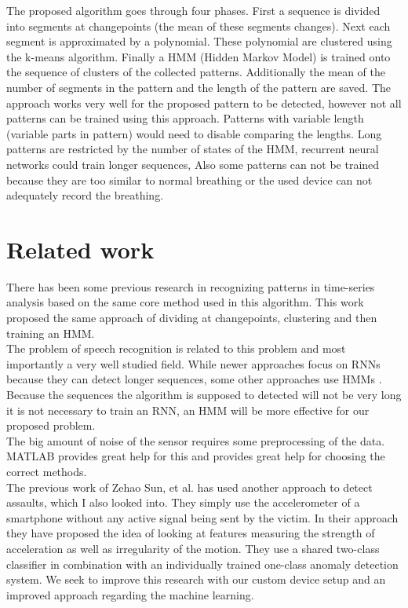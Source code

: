 \documentclass{article}
\begin{document}
The proposed algorithm goes through four phases. First a sequence is divided into segments at changepoints (the mean of these segments changes). Next each segment is approximated by a polynomial. These polynomial are clustered using the k-means algorithm. Finally a HMM (Hidden Markov Model) is trained onto the sequence of clusters of the collected patterns. Additionally the mean of the number of segments in the pattern and the length of the pattern are saved. The approach works very well for the proposed pattern to be detected, however not all patterns can be trained using this approach. Patterns with variable length (variable parts in pattern) would need to disable comparing the lengths. Long patterns are restricted by the number of states of the HMM, recurrent neural networks could train longer sequences, Also some patterns can not be trained because they are too similar to normal breathing or the used device can not adequately record the breathing.
\section{Related work}
\label{sec: related}
There has been some previous research in recognizing patterns in time-series analysis based on the same core method used in this algorithm. \cite{TimeseriesSri, BenChoi, FindingP10} This work proposed the same approach of dividing at changepoints, clustering and then training an HMM.\\
The problem of speech recognition is related to this problem and most importantly a very well studied field. While newer approaches focus on RNNs \cite{machine-learning-paradigms-for-speech-recognition-an-overview} because they can detect longer sequences, some other approaches use HMMs \cite{machine-learning-paradigms-for-speech-recognition-an-overview, zhangSpe91}. Because the sequences the algorithm is supposed to detected will not be very long it is not necessary to train an RNN, an HMM will be more effective for our proposed problem.\\
The big amount of noise of the sensor requires some preprocessing of the data. MATLAB provides great help for this and \cite{JSSv033i05} provides great help for choosing the correct methods. \\
The previous work of Zehao Sun, et al. \cite{Sun2015} has used another approach to detect assaults, which I also looked into. They simply use the accelerometer of a smartphone without any active signal being sent by the victim. In their approach they have proposed the idea of looking at features measuring the strength of acceleration as well as irregularity of the motion. They use a shared two-class classifier in combination with an individually trained one-class anomaly detection system. We seek to improve this research with our custom device setup and an improved approach regarding the machine learning.\\
\end{document}
